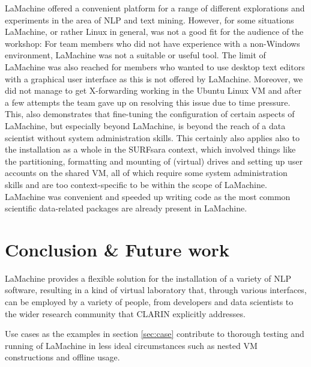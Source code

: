 \documentclass[a4paper,11pt]{article}
\begin{document}
LaMachine offered a convenient platform for a range of different explorations and experiments in the area of NLP and
text mining.  However, for some situations LaMachine, or rather Linux in general, was not a good fit for the audience of
the workshop: For team members who did not have experience with a non-Windows environment, LaMachine was not a suitable
or useful tool. The limit of LaMachine was also reached for members who wanted to use desktop text editors with a
graphical user interface as this is not offered by LaMachine. Moreover, we did not manage to get X-forwarding working in the
Ubuntu Linux VM and after a few attempts the team gave up on resolving this issue due to time pressure. This, also
demonstrates that fine-tuning the configuration of certain aspects of LaMachine, but especially beyond LaMachine, is beyond the reach of a data scientist
without system administration skills. This certainly also applies also to the installation as a whole in the
SURFsara context, which involved things like the partitioning, formatting and mounting of (virtual) drives and setting
up user accounts on the shared VM, all of which require some system administration skills and are too context-specific
to be within the scope of LaMachine.
LaMachine was convenient and speeded up writing code as the most common scientific data-related packages are already present in LaMachine.

\section{Conclusion \& Future work}

LaMachine provides a flexible solution for the installation of a variety of NLP software, resulting in a kind
of virtual laboratory that, through various interfaces, can be employed by a variety of people, from developers and data scientists to the wider research community that CLARIN explicitly addresses.

Use cases as the examples in section \ref{sec:case} contribute to thorough testing and running of LaMachine in less ideal
circumstances such as nested VM constructions and offline usage.
\end{document}
